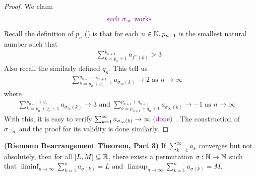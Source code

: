 \documentclass{report}
\begin{document}
\begin{proof}
We claim 
\begin{align*}
  \textcolor{violet}{\text{ such }\sigma_{\infty}\text{ works }}
\end{align*}
Recall the definition of $p_n$ () is that for each  $n\in\mathbb{N},p_{n+1}$ is the smallest natural number such that
\begin{align*}
\sum_{k=p_{n}+1}^{p_{n+1}}a_{f^+(k)}>3 
\end{align*}
Also recall the similarly defined $q_n$. This tell us 
\begin{align*}
\sum_{k=p_n+q_n+1}^{p_{n+1}+q_{n+1}}a_{\sigma_{\infty}(k)}\to 2\text{ as $n\to \infty$ }
\end{align*}
where 
\begin{align*}
\sum_{k=p_n+q_n+1}^{p_{n+1}+q_n}a_{\sigma_\infty(k)}\to 3\text{ and }\sum_{k=p_{n+1}+q_n+1}^{p_{n+1}+q_{n+1}}a_{\sigma_\infty(k)}\to -1\text{ as $n \to \infty$ }
\end{align*}
With this, it is easy to verify $\sum_{k=1}^\infty a_{\sigma_{\infty}(k)} \to \infty\textcolor{violet}{\text{ (done) }}$. The construction of $\sigma_{-\infty}$ and the proof for its validity is done similarly. 
\end{proof}
\begin{theorem}
\label{t2}
\textbf{(Riemann Rearrangement Theorem, Part 3)} If $\sum_{k=1}^\infty a_k$ converges but not absolutely, then for all $[L,M]\subseteq \mathbb{R}$, there exists a permutation $\sigma:\mathbb{N}\rightarrow \mathbb{N}$ such that $\liminf_{n\to\infty} \sum_{k=1}^n a_{\sigma(k)}=L\text{ and }\limsup_{n\to\infty} \sum_{k=1}^n a_{\sigma(k)}=M$.
\end{theorem}
\end{document}
